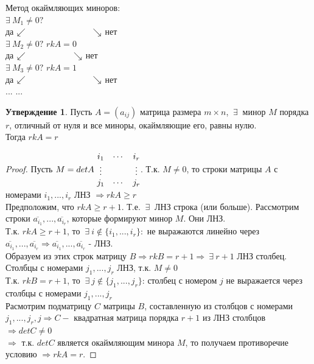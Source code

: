 \documentclass[a4paper, 12pt]{article}
\newcommand\tab[1][.5cm]{\hspace*{#1}}
\theoremstyle{definition}
\newtheorem*{subtheorem}{Утверждение}
\begin{document}
  Метод окаймляющих миноров: \vspace{0.2cm}\\
  \tab[7cm]$\exists \ M_1 \not = 0 ?$ \vspace{0.15cm}\\
  \tab[5.5cm] да $\swarrow \tab[2.8cm] \searrow $ нет \vspace{0.15cm}\\
  \tab[4.6cm]$\exists \ M_2 \not = 0 ?$ \tab[2.6cm] $rkA =0$ \vspace{0.15cm}\\ 
  \tab[3.3cm] да $\swarrow \tab[2cm] \searrow $ нет \vspace{0.15cm} \\
  \tab[2.3cm]$\exists \ M_3 \not = 0 ?$ \tab[2cm] $rkA = 1$ \vspace{0.15cm}\\
  \tab[1cm] да $\swarrow \tab[2.8cm] \searrow $ нет \vspace{0.15cm}\\
  \tab[1.3cm]$...$ \tab[4cm] $...$
  \begin{subtheorem}
    Пусть $A = (a_{ij})$ матрица размера $m \times n$, $\ \exists \ $ минор $M$ порядка $r$, отличный от нуля и все миноры, окаймляющие его, равны нулю. \\
    Тогда $rkA = r$   
  \end{subtheorem} 
  \begin{proof}
    Пусть $M = detA \ \begin{matrix}
      i_1 & \cdots & i_r \\
      \vdots & \null & \vdots \\
      j_1 & \cdots & j_r
    \end{matrix}$. \vspace{0.3cm} Т.к. $M \not = 0$, то строки матрицы $A$ с номерами $i_1,...,i_r$ ЛНЗ $\Longrightarrow rkA \geq r$ \\
    Предположим, что $rkA \geq r+1$. Т.е. $\ \exists \ $ ЛНЗ строка (или больше). Рассмотрим строки $\overline{a_{i_1}},...,\overline{a_{i_r}}$, которые формируют минор $M$. Они ЛНЗ. \\
    Т.к. $rkA \geq r+1$, то $\ \exists \ i \not \in \{i_1,...,i_r\}: $ не выражаются линейно через \\ $\overline{a_{i_1}},...,\overline{a_{i_r}} \Longrightarrow \overline{a_{i_1}},...,\overline{a_{i_r}}$ - ЛНЗ. \\
    Образуем из этих строк матрицу $B \Longrightarrow rkB = r+1 \Longrightarrow \ \exists \ r+1$ ЛНЗ столбец. \\
    Столбцы с номерами $j_1,...,j_r$ ЛНЗ, т.к. $M \not = 0$ \\
    Т.к. $rkB = r+1$, то $\ \exists \ j \not \in \{j_1,...,j_r\}$: столбец с номером $j$ не выражается через столбцы с номерами $j_1,...,j_r$ \\
    Расмотрим подматрицу $C$ матрицы $B$, составленную из столбцов с номерами $j_1,...,j_r,j \Longrightarrow C-$ квадратная матрица порядка $r+1$ из ЛНЗ столбцов $\Longrightarrow detC \not = 0$\\
    $\Longrightarrow $ т.к. $det C $ является окаймляющим минора $M$, то получаем противоречие условию $\Longrightarrow rkA = r$.    
  \end{proof} 
\end{document}

